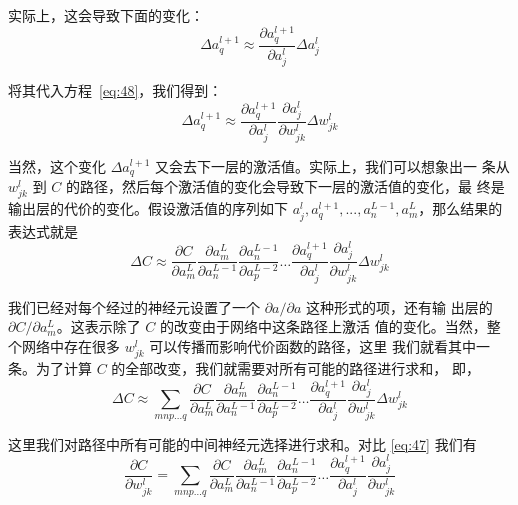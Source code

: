 实际上，这会导致下面的变化：
\begin{equation}
  \Delta a^{l+1}_q \approx \frac{\partial a^{l+1}_q}{\partial a^l_j} \Delta
  a^l_j
  \label{eq:49}\tag{49}
\end{equation}

将其代入方程~\eqref{eq:48}，我们得到：
\begin{equation}
  \Delta a^{l+1}_q \approx \frac{\partial a^{l+1}_q}{\partial a^l_j}
  \frac{\partial a^l_j}{\partial w^l_{jk}} \Delta w^l_{jk}
  \label{eq:50}\tag{50}
\end{equation}

当然，这个变化 $\Delta a^{l+1}_q$ 又会去下一层的激活值。实际上，我们可以想象出一
条从 $w_{jk}^l$ 到 $C$ 的路径，然后每个激活值的变化会导致下一层的激活值的变化，最
终是输出层的代价的变化。假设激活值的序列如下 $a_j^l, a_q^{l+1},
...,a_n^{L-1},a_m^{L}$，那么结果的表达式就是
\begin{equation}
  \Delta C \approx \frac{\partial C}{\partial a^L_m} 
  \frac{\partial a^L_m}{\partial a^{L-1}_n}
  \frac{\partial a^{L-1}_n}{\partial a^{L-2}_p} \ldots
  \frac{\partial a^{l+1}_q}{\partial a^l_j}
  \frac{\partial a^l_j}{\partial w^l_{jk}} \Delta w^l_{jk}
  \label{eq:51}\tag{51}
\end{equation}

我们已经对每个经过的神经元设置了一个 $\partial a/\partial a$ 这种形式的项，还有输
出层的 $\partial C/\partial a_m^L$。这表示除了 $C$ 的改变由于网络中这条路径上激活
值的变化。当然，整个网络中存在很多 $w_{jk}^l$ 可以传播而影响代价函数的路径，这里
我们就看其中一条。为了计算 $C$ 的全部改变，我们就需要对所有可能的路径进行求和，
即，
\begin{equation} 
  \Delta C \approx \sum_{mnp\ldots q} \frac{\partial C}{\partial a^L_m}
  \frac{\partial a^L_m}{\partial a^{L-1}_n} \frac{\partial a^{L-1}_n}{\partial
    a^{L-2}_p} \ldots \frac{\partial a^{l+1}_q}{\partial a^l_j} \frac{\partial
    a^l_j}{\partial w^l_{jk}} \Delta w^l_{jk}
  \label{eq:52}\tag{52}
\end{equation}

这里我们对路径中所有可能的中间神经元选择进行求和。对比 \eqref{eq:47} 我们有
\begin{equation} 
  \frac{\partial C}{\partial w^l_{jk}} = \sum_{mnp\ldots q} \frac{\partial
    C}{\partial a^L_m} \frac{\partial a^L_m}{\partial a^{L-1}_n} \frac{\partial
    a^{L-1}_n}{\partial a^{L-2}_p} \ldots \frac{\partial a^{l+1}_q}{\partial
    a^l_j} \frac{\partial a^l_j}{\partial w^l_{jk}}
\label{eq:53}\tag{53}
\end{equation}

